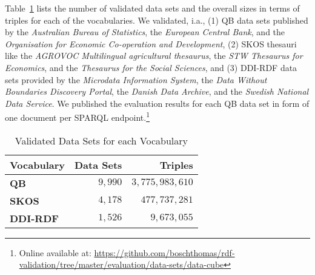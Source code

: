 \documentclass{llncs}
\newcommand{\ke}[1]{\todo[size=\small, color=orange!40]{\textbf{Kai:} #1}}
\begin{document}


Table~\ref{tab:datasets} lists the number of validated data sets and the overall sizes in terms of triples for each of the vocabularies. We validated, i.a., 
(1) QB data sets published by the \emph{Australian Bureau of Statistics},
the \emph{European Central Bank}, and the
\emph{Organisation for Economic Co-operation and Development},
(2) SKOS thesauri like the \emph{AGROVOC Multilingual agricultural thesaurus},
the \emph{STW Thesaurus for Economics}, and the
\emph{Thesaurus for the Social Sciences}, and
(3) DDI-RDF data sets provided by the \emph{Microdata Information System}, 
the \emph{Data Without Boundaries Discovery Portal}, the
\emph{Danish Data Archive}, and the
\emph{Swedish National Data Service}. We published the evaluation results for each QB data set in form of one document per SPARQL endpoint.\footnote{Online available at: \url{https://github.com/boschthomas/rdf-validation/tree/master/evaluation/data-sets/data-cube}}

\begin{table}[H]
		\scriptsize
    \begin{center}
		\caption{Validated Data Sets for each Vocabulary}
		\label{tab:datasets}
    \begin{tabular}{lrr}
           \textbf{Vocabulary}
           & \textbf{Data Sets}
           & \textbf{Triples}
					 
    \\ \midrule
		\textbf{QB} & $9,990$   & $3,775,983,610$  \\
		\textbf{SKOS} & $4,178$  & $477,737,281$ \\
		\textbf{DDI-RDF} & $1,526$  & $9,673,055$  \\
    \bottomrule
    \end{tabular}
    \end{center}
\end{table}
\end{document}
